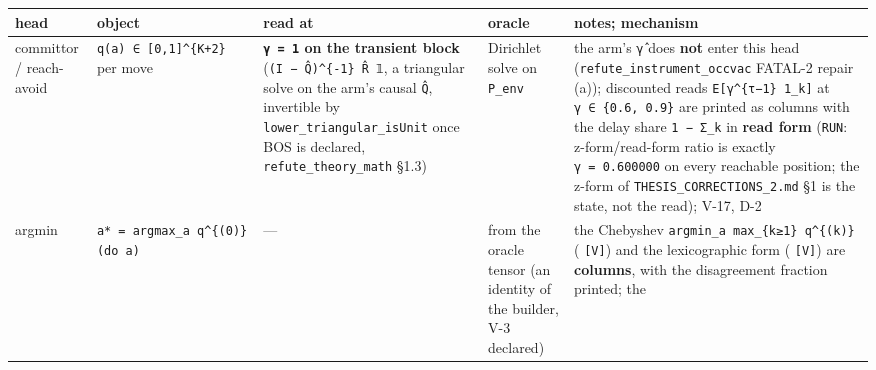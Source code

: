 \documentclass[11pt,a4paper]{article}
\newcounter{none}                 %
\theoremstyle{plain}
\theoremstyle{definition}
\theoremstyle{remark}
\begin{document}
{\def\LTcaptype{none} %
\begin{longtable}[]{@{}
  >{\raggedright\arraybackslash}p{}
  >{\raggedright\arraybackslash}p{}
  >{\raggedright\arraybackslash}p{}
  >{\raggedright\arraybackslash}p{}
  >{\raggedright\arraybackslash}p{}@{}}
\toprule\noalign{}
\begin{minipage}[b]{\linewidth}\raggedright
head
\end{minipage} & \begin{minipage}[b]{\linewidth}\raggedright
object
\end{minipage} & \begin{minipage}[b]{\linewidth}\raggedright
read at
\end{minipage} & \begin{minipage}[b]{\linewidth}\raggedright
oracle
\end{minipage} & \begin{minipage}[b]{\linewidth}\raggedright
notes; mechanism
\end{minipage} \\
\midrule\noalign{}
\endhead
\bottomrule\noalign{}
\endlastfoot
committor / reach-avoid & \texttt{q(a)\ ∈\ {[}0,1{]}\^{}\{K+2\}} per
move & \textbf{\texttt{γ\ =\ 1} on the transient block}
(\texttt{(I\ −\ Q̂)\^{}\{-1\}\ R̂\ 𝟙}, a triangular solve on the arm's
causal \texttt{Q̂}, invertible by \texttt{lower\_triangular\_isUnit} once
BOS is declared, \texttt{refute\_theory\_math} §1.3) & Dirichlet solve
on \texttt{P\_env} & the arm's \texttt{γ̂} does \textbf{not} enter this
head (\texttt{refute\_instrument\_occvac} FATAL-2 repair (a));
discounted reads \texttt{E{[}γ\^{}\{τ−1\}\ 1\_k{]}} at
\texttt{γ\ ∈\ \{0.6,\ 0.9\}} are printed as columns with the delay share
\texttt{1\ −\ Σ\_k} in \textbf{read form} (\texttt{RUN}:
z-form/read-form ratio is exactly \texttt{γ\ =\ 0.600000} on every
reachable position; the z-form of \texttt{THESIS\_CORRECTIONS\_2.md} §1
is the state, not the read); V-17, D-2 \\
argmin & \texttt{a*\ =\ argmax\_a\ q\^{}\{(0)\}(do\ a)} & --- & from the
oracle tensor (an identity of the builder, V-3 declared) & the Chebyshev
\texttt{argmin\_a\ max\_\{k≥1\}\ q\^{}\{(k)\}}
(\citep{vanmoffaert-2013-chebyshev} \texttt{{[}V{]}}) and the
lexicographic form (\citep{yang-2026-lexisafe} \texttt{{[}V{]}}) are
\textbf{columns}, with the disagreement fraction printed; the

\end{longtable}}
\end{document}
